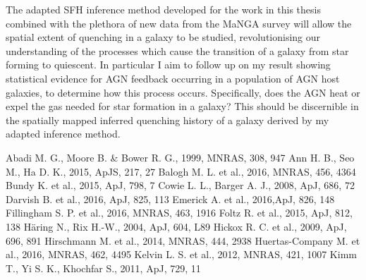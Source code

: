 \documentclass[12pt, usenatbib]{article}
\begin{document}
The adapted SFH inference method developed for the work in this thesis combined with the plethora of new data from the MaNGA survey will allow the spatial extent of quenching in a galaxy to be studied, revolutionising our understanding of the processes which cause the transition of a galaxy from star forming to quiescent. In particular I aim to follow up on my result showing statistical evidence for AGN feedback occurring in a population of AGN host galaxies, to determine how this process occurs. Specifically, does the AGN heat or expel the gas needed for star formation in a galaxy? This should be discernible in the spatially mapped inferred quenching history of a galaxy derived by my adapted inference method.  

\begin{thebibliography}{}
\small
\begin{multicols}{2}
 Abadi M. G., Moore B. \& Bower R. G., 1999, MNRAS, 308, 947
 Ann H. B., Seo M., Ha D. K., 2015, ApJS, 217, 27
 Balogh M. L. et al., 2016, MNRAS, 456, 4364
 Bundy K. et al., 2015, ApJ, 798, 7   
 Cowie L. L., Barger A. J., 2008, ApJ, 686, 72
 Darvish B. et al., 2016, ApJ, 825, 113
 Emerick A. et al., 2016,ApJ, 826, 148
 Fillingham S. P. et al., 2016, MNRAS, 463, 1916
 Foltz R. et al., 2015, ApJ, 812, 138
 H\"aring N., Rix H.-W., 2004, ApJ, 604, L89
 Hickox R. C. et al., 2009, ApJ, 696, 891
 Hirschmann M. et al., 2014, MNRAS, 444, 2938
 Huertas-Company M. et al., 2016, MNRAS, 462, 4495
 Kelvin L. S. et al., 2012, MNRAS, 421, 1007
 Kimm T., Yi S. K., Khochfar S., 2011, ApJ, 729, 11

\end{multicols}
\end{thebibliography}
\end{document}
